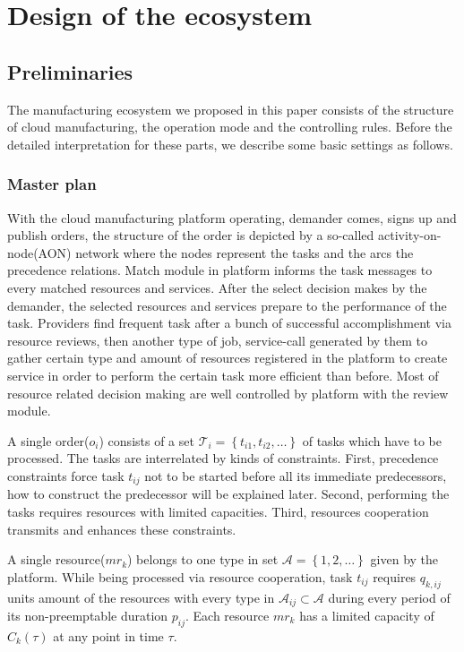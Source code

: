 \section{Design of the ecosystem} %
\label{sec:design_of_the_ecosystem}
\subsection{Preliminaries} %
\label{sub:preliminaries}
The manufacturing ecosystem we proposed in this paper consists of the structure of cloud manufacturing, the operation mode and the controlling rules. Before the detailed interpretation for these parts, we describe some basic settings as follows.

\subsubsection{Master plan} %
\label{ssub:master_plam}
With the cloud manufacturing platform operating, demander comes, signs up and publish orders, the structure of the order is depicted by a so-called activity-on-node(AON) network where the nodes represent the tasks and the arcs the precedence relations. Match module in platform informs the task messages to every matched resources and services. After the select decision makes by the demander, the selected resources and services prepare to the performance of the task.
Providers find frequent task after a bunch of successful accomplishment via resource reviews, then another type of job, service-call generated by them to gather certain type and amount of resources registered in the platform to create service in order to perform the certain task more efficient than before. Most of resource related decision making are well controlled by platform with the review module.

A single order($o_i$) consists of a set $\mathcal{T}_i = \left\{ t_{i1},t_{i2},\dots\right\}$ of tasks which have to be processed. The tasks are interrelated by kinds of constraints. First, precedence constraints force task $t_{ij}$ not to be started before all its immediate predecessors, how to construct the predecessor will be explained later. Second, performing the tasks requires resources with limited capacities. Third, resources cooperation transmits and enhances these constraints.

A single resource($mr_k$) belongs to one type in set $\mathcal{A} = \left\{1,2,\dots\right\}$ given by the platform. While being processed via resource cooperation, task $t_{ij}$ requires $q_{k,ij}$ units amount of the resources with every type in $\mathcal{A}_{ij}\subset\mathcal{A}$ during every period of its non-preemptable duration $p_{ij}$. Each resource $mr_k$ has a limited capacity of $C_k(\tau)$ at any point in time $\tau$.

